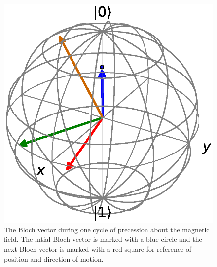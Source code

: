 \documentclass[letter]{article}
\begin{document}
\begin{figure}
  \centering
  \includegraphics{bloch.eps}
  \caption{The Bloch vector during one cycle of precession about the magnetic field. The intial Bloch vector is marked with a blue circle and the next Bloch vector is marked with a red square for reference of position and direction of motion.}
  \label{fig:blochvector}
\end{figure}
\end{document}
